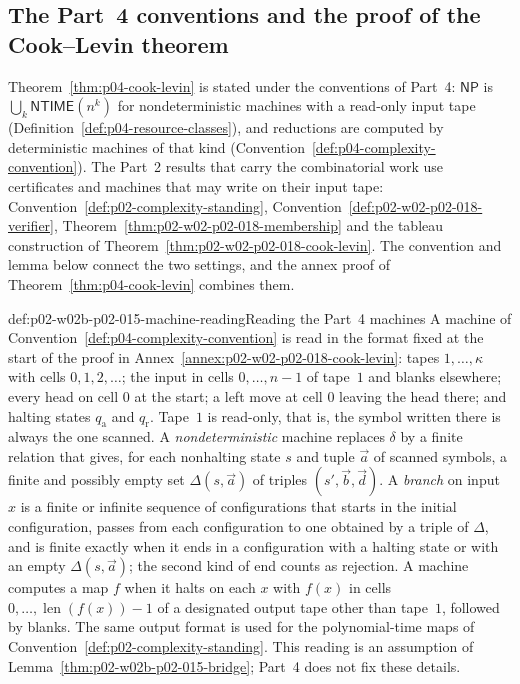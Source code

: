 \subsection{The Part~4 conventions and the proof of the Cook--Levin theorem}
\label{sec:p02-w02b-p02-015-cook-levin}

Theorem~\ref{thm:p04-cook-levin} is stated under the conventions of Part~4:
\(\mathsf{NP}\) is \(\bigcup_k\mathsf{NTIME}(n^k)\) for nondeterministic
machines with a read-only input tape
(Definition~\ref{def:p04-resource-classes}), and reductions are computed by
deterministic machines of that kind
(Convention~\ref{def:p04-complexity-convention}).  The Part~2 results that
carry the combinatorial work use certificates and machines that may write on
their input tape: Convention~\ref{def:p02-complexity-standing},
Convention~\ref{def:p02-w02-p02-018-verifier},
Theorem~\ref{thm:p02-w02-p02-018-membership} and the tableau construction of
Theorem~\ref{thm:p02-w02-p02-018-cook-levin}.  The convention and lemma below
connect the two settings, and the annex proof of
Theorem~\ref{thm:p04-cook-levin} combines them.

\begin{hbconvention}{def:p02-w02b-p02-015-machine-reading}{Reading the Part~4 machines}
A machine of Convention~\ref{def:p04-complexity-convention} is read in the
format fixed at the start of the proof in
Annex~\ref{annex:p02-w02-p02-018-cook-levin}: tapes \(1,\ldots,\kappa\) with
cells \(0,1,2,\ldots\); the input in cells \(0,\ldots,n-1\) of tape~\(1\)
and blanks elsewhere; every head on cell \(0\) at the start; a left move at
cell \(0\) leaving the head there; and halting states \(q_{\mathrm a}\) and
\(q_{\mathrm r}\).  Tape~\(1\) is read-only, that is, the symbol written there
is always the one scanned.  A \emph{nondeterministic} machine replaces
\(\delta\) by a finite relation that gives, for each nonhalting state \(s\)
and tuple \(\vec a\) of scanned symbols, a finite and possibly empty set
\(\Delta(s,\vec a)\) of triples \((s',\vec b,\vec d)\).  A \emph{branch} on
input \(x\) is a finite or infinite sequence of configurations that starts in
the initial configuration, passes from each configuration to one obtained by
a triple of \(\Delta\), and is finite exactly when it ends in a configuration
with a halting state or with an empty \(\Delta(s,\vec a)\); the second kind
of end counts as rejection.  A machine computes a map \(f\) when it halts on
each \(x\) with \(f(x)\) in cells \(0,\ldots,\operatorname{len}(f(x))-1\) of a
designated output tape other than tape~\(1\), followed by blanks.  The same
output format is used for the polynomial-time maps of
Convention~\ref{def:p02-complexity-standing}.  This reading is an assumption
of Lemma~\ref{thm:p02-w02b-p02-015-bridge}; Part~4 does not fix these
details.
\end{hbconvention}

